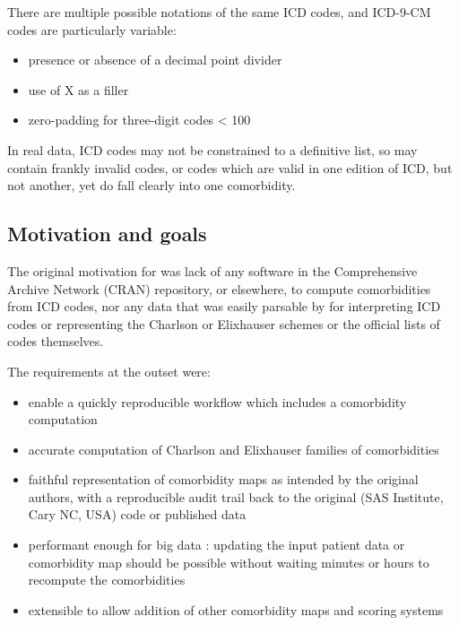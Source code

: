 \documentclass[article]{jss}
\providecommand{\tightlist}{%
  \setlength{\itemsep}{0pt}\setlength{\parskip}{0pt}}
\begin{document}
There are multiple possible notations of the same ICD codes, and
ICD-9-CM codes are particularly variable:

\begin{itemize}
\tightlist
\item
  presence or absence of a decimal point divider
\item
  use of X as a filler
\item
  zero-padding for three-digit codes \textless{} 100
\end{itemize}

In real data, ICD codes may not be constrained to a definitive list, so
may contain frankly invalid codes, or codes which are valid in one
edition of ICD, but not another, yet do fall clearly into one
comorbidity.

\hypertarget{motivation-and-goals}{%
\subsection{Motivation and goals}\label{motivation-and-goals}}

The original motivation for  was lack of any 
software in the Comprehensive  Archive Network (CRAN)
repository, or elsewhere, to compute comorbidities from ICD codes, nor
any data that was easily parsable by  for interpreting ICD
codes or representing the Charlson or Elixhauser schemes or the official
lists of codes themselves.

The requirements at the outset were:

\begin{itemize}
\tightlist
\item
  enable a quickly reproducible workflow which includes a comorbidity
  computation
\item
  accurate computation of Charlson and Elixhauser families of
  comorbidities
\item
  faithful representation of comorbidity maps as intended by the
  original authors, with a reproducible audit trail back to the original
   (SAS Institute, Cary NC, USA) code or published data
\item
  performant enough for big data \citep{simpao_big_2015}: updating the
  input patient data or comorbidity map should be possible without
  waiting minutes or hours to recompute the comorbidities
\item
  extensible to allow addition of other comorbidity maps and scoring
  systems
\end{itemize}
\end{document}
